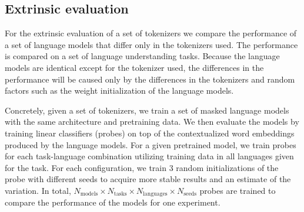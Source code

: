 \subsection{Extrinsic evaluation}

For the extrinsic evaluation of a set of tokenizers we compare the performance of a set of language models that differ only in the tokenizers used. The performance is compared on a set of language understanding tasks.
Because the language models are identical except for the tokenizer used, the differences in the performance will be caused only by the differences in the tokenizers and random factors such as the weight initialization of the language models.

Concretely, given a set of tokenizers, we train a set of masked language models with the same architecture and pretraining data. We then evaluate the models by training linear classifiers (probes) on top of the contextualized word embeddings produced by the language models. For a given pretrained model, we train probes for each task-language combination utilizing training data in all languages given for the task. For each configuration, we train 3 random initializations of the probe with different seeds to acquire more stable results and an estimate of the variation. In total, $N_\mathrm{models} \times N_\mathrm{tasks} \times N_\mathrm{languages} \times N_\mathrm{seeds}$ probes are trained to compare the performance of the models for one experiment.

